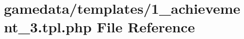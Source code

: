 \hypertarget{1__achievement__3_8tpl_8php}{\section{gamedata/templates/1\+\_\+achievement\+\_\+3.tpl.\+php File Reference}
\label{1__achievement__3_8tpl_8php}
}
